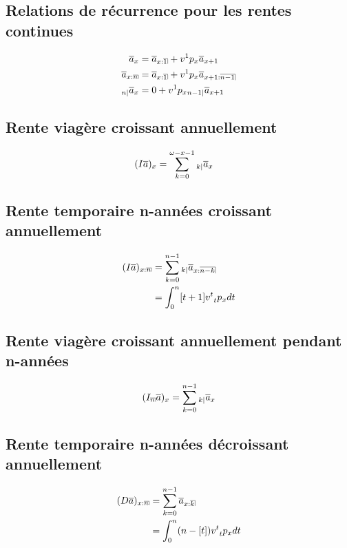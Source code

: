 \documentclass[11pt,french]{report}
\makeatletter
\DeclareRobustCommand{\annuity}[1]{%
\def\arraystretch{0}%
\setlength\arraycolsep{.7pt}%
\setlength\arrayrulewidth{.3pt}%
\begin{array}[b]{@{}c|}\hline
\\[\arraycolsep]%
\scriptstyle #1%
\end{array}%
}
\newcommand{\indiceGauche}[2]{{\vphantom{#2}}_{#1}#2}
\makeatother
\begin{document}
\subsection{Relations de récurrence pour les rentes continues}
\begin{align*}
\overline{a}_x &= \overline{a}_{x:\annuity{1}} + v^1 p_x \overline{a}_{x+1} \\
\overline{a}_{x:\annuity{n}} &= \overline{a}_{x:\annuity{1}} + v^1 p_x \overline{a}_{x+1:\annuity{n-1}} \\
\indiceGauche{n|}{\overline{a}}_x &= 0 +  v^1 p_x \indiceGauche{n-1|}{\overline{a}}_{x+1} \\
\end{align*}

\subsection{Rente viagère croissant annuellement}
\begin{align*}
(I\overline{a})_x &= \sum_{k=0}^{\omega - x -1} \indiceGauche{k|}{\overline{a}}_x
\end{align*}

\subsection{Rente temporaire n-années croissant annuellement}
\begin{align*}
(I\overline{a})_{x:\annuity{n}} &= \sum_{k=0}^{n -1} \indiceGauche{k|}{\overline{a}}_{x:\annuity{n-k}} \\
&= \int_{0}^{n} [t+1]v^t \indiceGauche{t}{p}_x dt \\
\end{align*}

\subsection{Rente viagère croissant annuellement pendant n-années}
\begin{align*}
(I_{\annuity{n}}\overline{a})_{x} &= \sum_{k=0}^{n -1} \indiceGauche{k|}{\overline{a}}_{x} \\
\end{align*}

\subsection{Rente temporaire n-années décroissant annuellement}
\begin{align*}
(D\overline{a})_{x:\annuity{n}} &= \sum_{k=0}^{n -1} \overline{a}_{x:\annuity{k}} \\
&= \int_{0}^{n} (n-[t])v^t \indiceGauche{t}{p}_x dt \\
\end{align*}
\end{document}
